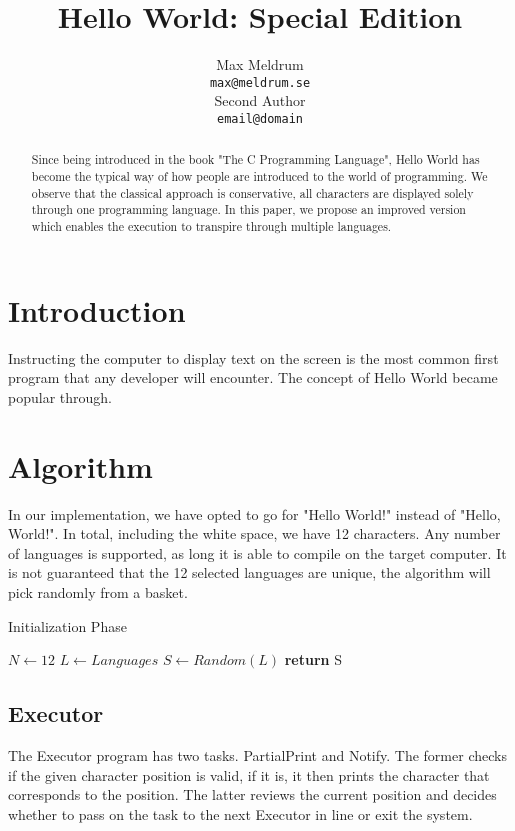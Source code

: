 \documentclass[11pt]{article}
\title{Hello World: Special Edition}
\author{Max Meldrum \\
{\tt max@meldrum.se} \\\And
Second Author \\
{\tt email@domain} \\}
\date{}
\begin{document}
\maketitle
\begin{abstract}
Since being introduced in the book "The C Programming Language", Hello World has become the typical way of how people are introduced to the world of programming. We observe that the classical approach is conservative, all characters are displayed solely through one programming language. In this paper, we propose an improved version which enables the execution to transpire through multiple languages.
\end{abstract}

\section{Introduction}
Instructing the computer to display text on the screen is the most common first program that any developer will encounter. The concept of Hello World became popular through\cite{Kernighan:1988:CPL:576122}. 

\section{Algorithm}
In our implementation, we have opted to go for "Hello World!" instead of "Hello, World!". In total, including the white space, we have 12 characters. Any number of languages is supported, as long it is able to compile on the target computer. It is not guaranteed that the 12 selected languages are unique, the algorithm will pick randomly from a basket.
\begin{algorithm}
\caption{Initialization Phase}
\label{Special Edition}
\begin{algorithmic}[1]
\State $N\gets 12$
\State $L\gets Languages$
	\State $S\gets Random(L)$
\EndFor
\State \textbf{return} S
\EndProcedure
\end{algorithmic}
\end{algorithm}

\subsection{Executor}
The Executor program has two tasks. PartialPrint and Notify. The former checks if the given character position is valid, if it is, it then prints the character that corresponds to the position. The latter reviews the current position and decides whether to pass on the task to the next Executor in line or exit the system.
\end{document}
